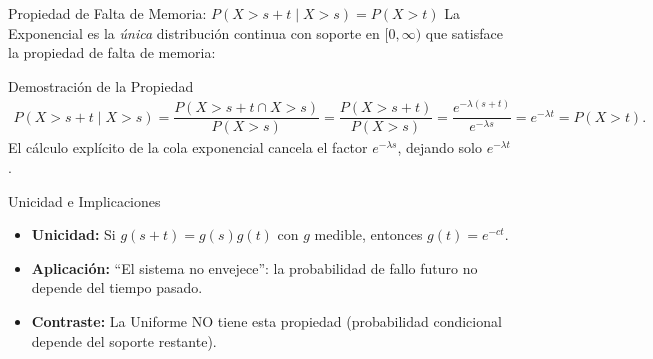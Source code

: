 \documentclass[10pt, aspectratio=169]{beamer}
\begin{document}
\begin{frame}{Propiedad de Falta de Memoria: $P(X > s + t \mid X > s) = P(X > t)$}
  \footnotesize
  La Exponencial es la \emph{única} distribución continua con soporte en $[0, \infty)$ que satisface la propiedad de falta de memoria: \pause

  \vspace{0.1cm}
  \begin{block}{Demostración de la Propiedad}
    \begin{align*}
      P(X > s + t \mid X > s) = \dfrac{P(X > s + t \cap X > s)}{P(X > s)} = \dfrac{P(X > s + t)}{P(X > s)} = \dfrac{e^{-\lambda(s+t)}}{e^{-\lambda s}} = e^{-\lambda t} = P(X > t).
    \end{align*}
    El cálculo explícito de la cola exponencial cancela el factor $e^{-\lambda s}$, dejando solo $e^{-\lambda t}$.
  \end{block}

  \vspace{0.1cm}
  \pause
  \begin{alertblock}{Unicidad e Implicaciones}
    \begin{itemize}\itemsep=0.05cm
      \item \textbf{Unicidad:} Si $g(s+t) = g(s) g(t)$ con $g$ medible, entonces $g(t) = e^{-ct}$.
      \item \textbf{Aplicación:} ``El sistema no envejece'': la probabilidad de fallo futuro no depende del tiempo pasado.
      \item \textbf{Contraste:} La Uniforme NO tiene esta propiedad (probabilidad condicional depende del soporte restante).
    \end{itemize}
  \end{alertblock}
\end{frame}
\end{document}
